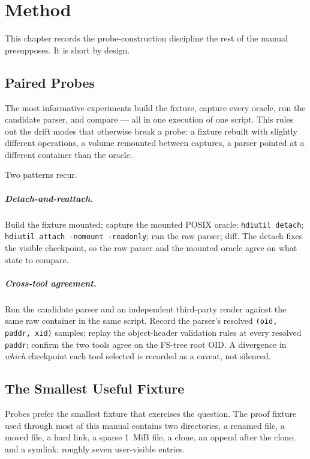 \chapter{Method}

This chapter records the probe-construction discipline the rest of
the manual presupposes. It is short by design.

\section{Paired Probes}

The most informative experiments build the fixture, capture every
oracle, run the candidate parser, and compare --- all in one
execution of one script. This rules out the drift modes that
otherwise break a probe: a fixture rebuilt with slightly different
operations, a volume remounted between captures, a parser pointed
at a different container than the oracle.

Two patterns recur.

\paragraph{Detach-and-reattach.} Build the fixture mounted; capture
the mounted POSIX oracle; \texttt{hdiutil detach};
\texttt{hdiutil attach -nomount -readonly}; run the raw parser;
diff. The detach fixes the visible checkpoint, so the raw parser
and the mounted oracle agree on what state to compare.

\paragraph{Cross-tool agreement.} Run the candidate parser and an
independent third-party reader against the same raw container in
the same script. Record the parser's resolved
\texttt{(oid, paddr, xid)} samples; replay the object-header
validation rules at every resolved \texttt{paddr}; confirm the two
tools agree on the FS-tree root OID. A divergence in
\emph{which} checkpoint each tool selected is recorded as a
caveat, not silenced.

\section{The Smallest Useful Fixture}

Probes prefer the smallest fixture that exercises the question.
The proof fixture used through most of this manual contains two
directories, a renamed file, a moved file, a hard link, a sparse
1~MiB file, a clone, an append after the clone, and a symlink:
roughly seven user-visible entries.

